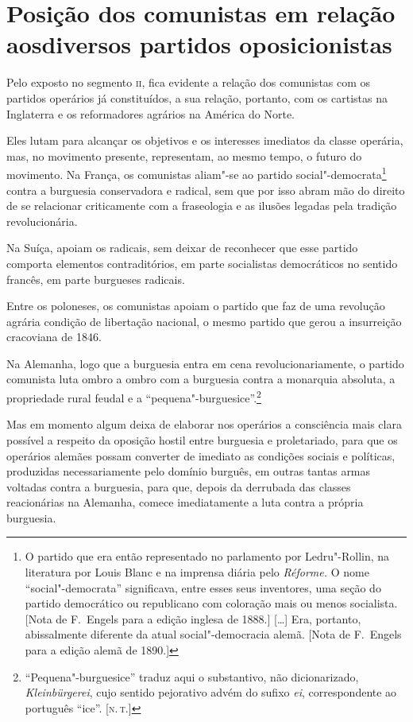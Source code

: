 \section{Posição dos comunistas em relação aos\break diversos partidos oposicionistas}

Pelo exposto no segmento \textsc{ii}, fica evidente a relação dos comunistas 
com os partidos operários já constituídos, a sua relação, portanto, 
com os cartistas na Inglaterra e os reformadores agrários na América do
Norte.

Eles lutam para alcançar os objetivos e os interesses imediatos
da classe operária, mas, no movimento presente, representam, ao mesmo
tempo, o futuro do movimento. Na França, os comunistas aliam"-se ao
partido social"-democrata\footnote{ O partido que era então representado 
no parlamento por Ledru"-Rollin, na literatura por Louis Blanc e na 
imprensa diária pelo \textit{Réforme.} O nome ``social"-democrata'' 
significava, entre esses seus inventores, uma seção do partido 
democrático ou republicano com coloração mais ou menos socialista. 
[Nota de F.~Engels para a edição inglesa de 1888.] [\ldots] Era, portanto, abissalmente diferente da atual social"-democracia 
alemã. [Nota de F.~Engels para a edição alemã de 1890.]}
contra a burguesia conservadora e radical, sem que por isso abram mão do direito 
de se relacionar criticamente com a
fraseologia e as ilusões legadas pela tradição revolucionária.

Na Suíça, apoiam os radicais, sem deixar de reconhecer que esse partido
comporta elementos contraditórios, em parte socialistas democráticos no
sentido francês, em parte burgueses radicais.

Entre os poloneses, os comunistas apoiam o partido que faz de uma
revolução agrária condição de libertação nacional, o mesmo partido que
gerou a insurreição cracoviana de 1846.

Na Alemanha, logo que a burguesia entra em cena revolucionariamente, o 
partido comunista luta ombro a ombro com a burguesia contra a monarquia absoluta, 
a propriedade rural feudal e a ``pequena"-burguesice''.\footnote{ ``Pequena"-burguesice'' traduz aqui o substantivo, não dicionarizado, \textit{Kleinbürgerei}, 
cujo sentido pejorativo advém do sufixo \textit{ei}, correspondente ao português ``ice''. [\textsc{n.\,t.}]}

Mas em momento algum deixa de elaborar nos operários a consciência mais clara possível a respeito da oposição hostil entre burguesia e
proletariado, para que os operários alemães possam converter de
imediato as condições sociais e políticas, produzidas necessariamente
pelo domínio burguês, em outras tantas armas voltadas contra a
burguesia, para que, depois da derrubada das classes reacionárias na
Alemanha, comece imediatamente a luta contra a própria burguesia.

